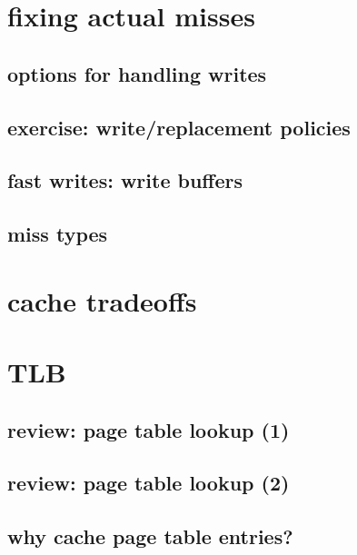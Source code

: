 \section{fixing actual misses}


\subsection{options for handling writes}


\subsection{exercise: write/replacement policies}


\subsection{fast writes: write buffers}


\subsection{miss types}


\section{cache tradeoffs}


\section{TLB}

\subsection{review: page table lookup (1)}


\subsection{review: page table lookup (2)}

\subsection{why cache page table entries?}


